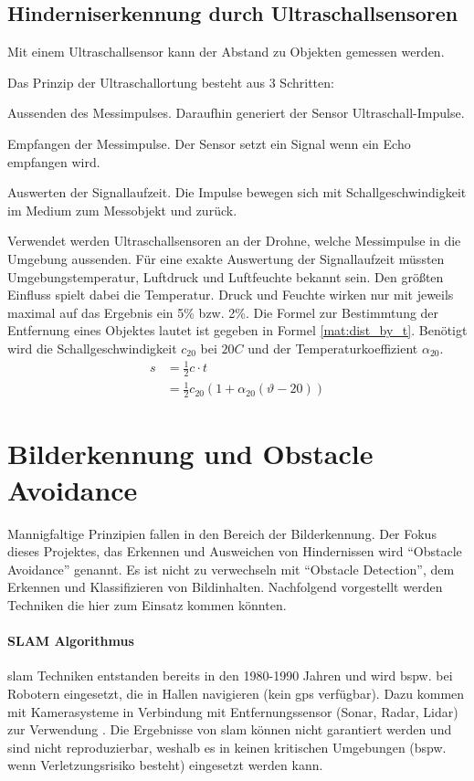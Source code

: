 \subsection{Hinderniserkennung durch Ultraschallsensoren}\label{chap:ultrasonic}
Mit einem Ultraschallsensor kann der Abstand zu Objekten gemessen werden. 

Das Prinzip der Ultraschallortung besteht aus 3 Schritten:
\begin{compactenum}
	\item Aussenden des Messimpulses. Daraufhin generiert der Sensor Ultraschall-Impulse.
	\item Empfangen der Messimpulse. Der Sensor setzt ein Signal wenn ein Echo empfangen wird.
	\item Auswerten der Signallaufzeit. Die Impulse bewegen sich mit Schallgeschwindigkeit im Medium zum Messobjekt und zurück.
\end{compactenum}

Verwendet werden Ultraschallsensoren an der Drohne, welche Messimpulse in die Umgebung aussenden. Für eine exakte Auswertung der Signallaufzeit müssten Umgebungstemperatur, Luftdruck und Luftfeuchte bekannt sein. Den größten Einfluss spielt dabei die Temperatur. Druck und Feuchte wirken nur mit jeweils maximal auf das Ergebnis ein 5\% bzw. 2\%.\newline
Die Formel zur Bestimmtung der Entfernung eines Objektes lautet ist gegeben in Formel \ref{mat:dist_by_t}. Benötigt wird die Schallgeschwindigkeit $c_{20}$ bei $20 C$ und der Temperaturkoeffizient $\alpha_{20}$\cite[Seite 152]{grudenSensorikUndMesswertverarbeitung2022}.
\begin{align}
	s &=\frac{1}{2}c\cdot t\\
	&=\frac{1}{2}c_{20}(1+\alpha_{20}(\vartheta-20))	\label{mat:dist_by_t}
\end{align}

\section{Bilderkennung und Obstacle Avoidance}
Mannigfaltige Prinzipien fallen in den Bereich der Bilderkennung. Der Fokus dieses Projektes, das Erkennen und Ausweichen von Hindernissen wird \enquote{Obstacle Avoidance} genannt. Es ist nicht zu verwechseln mit \enquote{Obstacle Detection}, dem Erkennen und Klassifizieren von Bildinhalten. Nachfolgend vorgestellt werden Techniken die hier zum Einsatz kommen könnten. 
\paragraph*{SLAM Algorithmus}\label{chap:slam}
\Gls{slam} Techniken entstanden bereits in den 1980-1990 Jahren und wird bspw. bei Robotern eingesetzt, die in Hallen navigieren (kein \gls{gps} verfügbar). Dazu kommen mit Kamerasysteme in Verbindung mit Entfernungssensor (Sonar, Radar, Lidar) zur Verwendung . Die Ergebnisse von \gls{slam} können nicht garantiert werden und sind nicht reproduzierbar, weshalb es in keinen kritischen Umgebungen (bspw. wenn Verletzungsrisiko besteht) eingesetzt werden kann.

